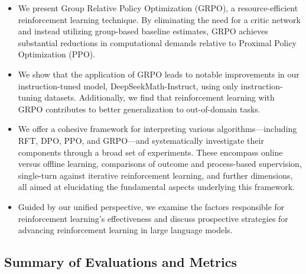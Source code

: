 \begin{itemize}[topsep=0pt]
    \item We present Group Relative Policy Optimization (GRPO), a resource-efficient reinforcement learning technique. By eliminating the need for a critic network and instead utilizing group-based baseline estimates, GRPO achieves substantial reductions in computational demands relative to Proximal Policy Optimization (PPO).
    \item We show that the application of GRPO leads to notable improvements in our instruction-tuned model, DeepSeekMath-Instruct, using only instruction-tuning datasets. Additionally, we find that reinforcement learning with GRPO contributes to better generalization to out-of-domain tasks.
    \item We offer a cohesive framework for interpreting various algorithms—including RFT, DPO, PPO, and GRPO—and systematically investigate their components through a broad set of experiments. These encompass online versus offline learning, comparisons of outcome and process-based supervision, single-turn against iterative reinforcement learning, and further dimensions, all aimed at elucidating the fundamental aspects underlying this framework.
    \item Guided by our unified perspective, we examine the factors responsible for reinforcement learning’s effectiveness and discuss prospective strategies for advancing reinforcement learning in large language models.
\end{itemize}

\subsection{Summary of Evaluations and Metrics}

